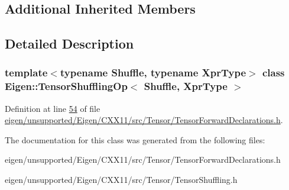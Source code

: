 \subsection*{Additional Inherited Members}


\subsection{Detailed Description}
\subsubsection*{template$<$typename Shuffle, typename Xpr\+Type$>$\newline
class Eigen\+::\+Tensor\+Shuffling\+Op$<$ Shuffle, Xpr\+Type $>$}



Definition at line \hyperlink{eigen_2unsupported_2_eigen_2_c_x_x11_2src_2_tensor_2_tensor_forward_declarations_8h_source_l00054}{54} of file \hyperlink{eigen_2unsupported_2_eigen_2_c_x_x11_2src_2_tensor_2_tensor_forward_declarations_8h_source}{eigen/unsupported/\+Eigen/\+C\+X\+X11/src/\+Tensor/\+Tensor\+Forward\+Declarations.\+h}.



The documentation for this class was generated from the following files\+:\begin{DoxyCompactItemize}
\item 
eigen/unsupported/\+Eigen/\+C\+X\+X11/src/\+Tensor/\+Tensor\+Forward\+Declarations.\+h\item 
eigen/unsupported/\+Eigen/\+C\+X\+X11/src/\+Tensor/\+Tensor\+Shuffling.\+h\end{DoxyCompactItemize}
